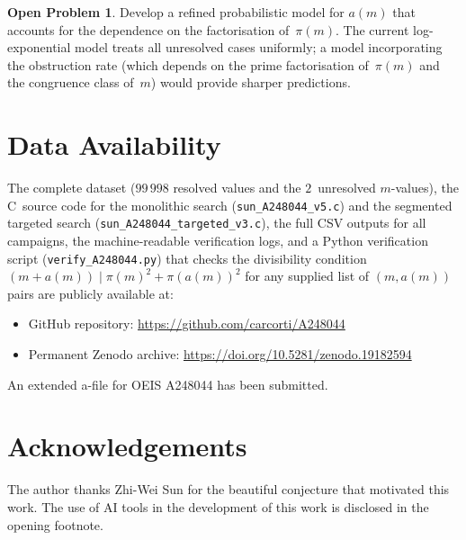 \documentclass{amsart}
\theoremstyle{definition}
\newtheorem{openproblem}[theorem]{Open Problem}
\theoremstyle{remark}
\numberwithin{equation}{section}
\begin{document}
\begin{openproblem}\label{op:model}
Develop a refined probabilistic model for $a(m)$ that
accounts for the dependence on the factorisation of~$\pi(m)$.
The current log-exponential model treats all unresolved cases
uniformly; a model incorporating the obstruction rate
(which depends on the prime factorisation of~$\pi(m)$ and the
congruence class of~$m$) would provide sharper predictions.
\end{openproblem}

\section*{Data Availability}

The complete dataset ($99\,998$ resolved values and the
$2$~unresolved $m$-values), the C~source code for the monolithic
search (\texttt{sun\_A248044\_v5.c}) and the segmented targeted
search (\texttt{sun\_A248044\_targeted\_v3.c}), the full CSV
outputs for all campaigns, the machine-readable verification
logs, and a Python verification script (\texttt{verify\_A248044.py})
that checks the divisibility condition
$(m+a(m)) \mid \pi(m)^2 + \pi(a(m))^2$ for any supplied list
of $(m, a(m))$ pairs are publicly available at:
\begin{itemize}
\item GitHub repository:
      \url{https://github.com/carcorti/A248044}
\item Permanent Zenodo archive:
      \url{https://doi.org/10.5281/zenodo.19182594}
\end{itemize}
An extended a-file for OEIS A248044 has been submitted.

\section*{Acknowledgements}

The author thanks Zhi-Wei Sun for the beautiful conjecture that
motivated this work.
The use of AI tools in the development of this work is disclosed
in the opening footnote.
\end{document}
